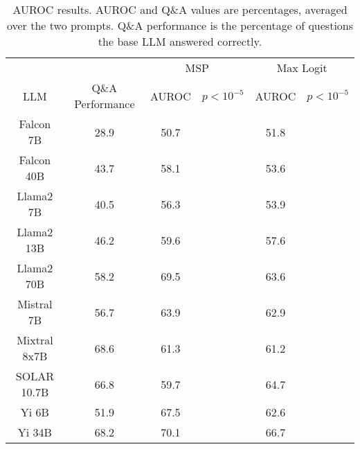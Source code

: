 \begin{table*}
\centering
\begin{tabular}{c|c|c|c|c|c}
& & \multicolumn{2}{c|}{MSP} & \multicolumn{2}{c}{Max Logit} \\ 
LLM & Q\&A Performance & AUROC & $p < 10^{-5}$ & AUROC & $p < 10^{-5}$\\ \hline
Falcon 7B & 28.9 & 50.7 &  & 51.8 & \\
Falcon 40B & 43.7 & 58.1 &  & 53.6 & \\
Llama2 7B & 40.5 & 56.3 &  & 53.9 & \\
Llama2 13B & 46.2 & 59.6 &  & 57.6 & \\
Llama2 70B & 58.2 & 69.5 &  & 63.6 & \\
Mistral 7B & 56.7 & 63.9 &  & 62.9 & \\
Mixtral 8x7B & 68.6 & 61.3 &  & 61.2 & \\
SOLAR 10.7B & 66.8 & 59.7 &  & 64.7 & \\
Yi 6B & 51.9 & 67.5 &  & 62.6 & \\
Yi 34B & 68.2 & 70.1 &  & 66.7 & \\
\hline
\end{tabular}
\caption{AUROC results. AUROC and Q\&A values are percentages, averaged over the two prompts. Q\&A performance is the percentage of questions the base LLM answered correctly.}
\label{tab:auroc}
\end{table*}
